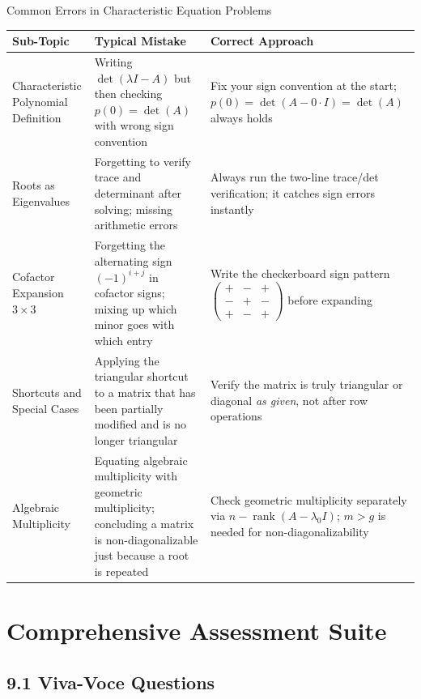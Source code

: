 \documentclass[12pt,a4paper]{article}
\begin{document}
\begin{mistakebox}{Common Errors in Characteristic Equation Problems}
\begin{tabular}{@{}p{3.5cm} p{5cm} p{5cm}@{}}
\toprule
\textbf{Sub-Topic} & \textbf{Typical Mistake} & \textbf{Correct Approach} \\
\midrule
Characteristic Polynomial Definition
  & Writing $\det(\lambda I - A)$ but then checking $p(0)=\det(A)$ with wrong sign convention
  & Fix your sign convention at the start; $p(0)=\det(A-0\cdot I)=\det(A)$ always holds \\
\addlinespace
Roots as Eigenvalues
  & Forgetting to verify trace and determinant after solving; missing arithmetic errors
  & Always run the two-line trace/det verification; it catches sign errors instantly \\
\addlinespace
Cofactor Expansion $3\times3$
  & Forgetting the alternating sign $(-1)^{i+j}$ in cofactor signs; mixing up which minor goes with which entry
  & Write the checkerboard sign pattern $\begin{pmatrix}+&-&+\\-&+&-\\+&-&+\end{pmatrix}$ before expanding \\
\addlinespace
Shortcuts and Special Cases
  & Applying the triangular shortcut to a matrix that has been partially modified and is no longer triangular
  & Verify the matrix is truly triangular or diagonal \emph{as given}, not after row operations \\
\addlinespace
Algebraic Multiplicity
  & Equating algebraic multiplicity with geometric multiplicity; concluding a matrix is non-diagonalizable just because a root is repeated
  & Check geometric multiplicity separately via $n - \operatorname{rank}(A-\lambda_0 I)$; $m>g$ is needed for non-diagonalizability \\
\bottomrule
\end{tabular}
\end{mistakebox}

\section{Comprehensive Assessment Suite}

\subsection*{9.1 Viva-Voce Questions}
\end{document}
